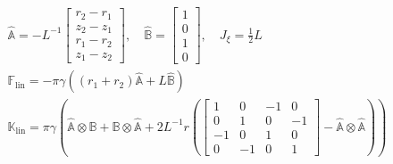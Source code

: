 \documentclass[a4paper,11pt]{article}
\newcommand{\ta}[1]{\text{\boldmath $#1$}} %
\newcommand{\uv}[1]{\mathbb{#1}}
\newcommand{\um}[1]{\mathbb{#1}}
\newcommand{\linear}{\mathrm{lin}}
\begin{document}
\begin{gather}
 \nonumber \hat{\uv A} = -L^{-1}\begin{bmatrix}r_2-r_1\\z_2-z_1\\r_1-r_2\\z_1-z_2\end{bmatrix}, \quad
 \hat{\uv B} = \begin{bmatrix}1\\0\\1\\0\end{bmatrix},\quad J_\xi = \frac12 L\\
 \uv F_\linear = -\pi \gamma \left((r_1+r_2)\hat{\uv A} + L\hat{\uv B}\right)\\
 \um K_\linear = \pi \gamma \left(
  \hat{\uv A}\otimes\uv B + \hat{\uv B}\otimes\hat{\uv A}
  + 2L^{-1} r \left(\begin{bmatrix}1&0&-1&0\\0&1&0&-1\\-1&0&1&0\\0&-1&0&1\end{bmatrix} - \hat{\uv A}\otimes\hat{\uv A}\right)
  \right)
\end{gather}
\end{document}
